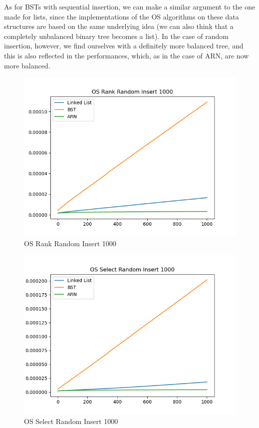 \documentclass[11pt]{article}
\begin{document}
As for BSTs with sequential insertion, we can make a similar argument to the one made for lists, since the implementations of the OS algorithms on these data structures are based on the same underlying idea (we can also think that a completely unbalanced binary tree becomes a list). In the case of random insertion, however, we find ourselves with a definitely more balanced tree, and this is also reflected in the performances, which, as in the case of ARN, are now more balanced.
 \begin{figure}[H]
  \centering
  \includegraphics[width=0.8\linewidth]{Images/1000/OS Rank Random Insert 1000.png}
  \caption{OS Rank Random Insert 1000 }
  \label{fig:OS Rank Random Insert 1000}
\end{figure}
 \begin{figure}[H]
  \centering
  \includegraphics[width=0.8\linewidth]{Images/1000/OS Select Random Insert 1000.png}
  \caption{OS Select Random Insert 1000 }
  \label{fig:OS Select Random Insert 1000}
\end{figure}
\end{document}
